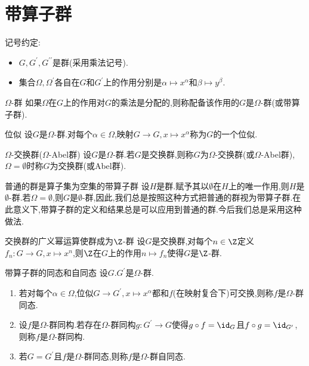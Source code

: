 \section{带算子群}

记号约定:
\begin{itemize}
	\item $G,G^{\prime},G^{\prime\prime}$是群(采用乘法记号).
	\item 集合$\Omega,\Omega^{\prime}$各自在$G$和$G^{\prime}$上的作用分别是$\alpha\mapsto x^{\alpha}$和$\beta\mapsto y^{\beta}$.
\end{itemize}

\begin{definition}{$\Omega$-群}{}
	如果$\Omega$在$G$上的作用对$G$的乘法是分配的,则称配备该作用的$G$是$\Omega$-群(或带算子群).
\end{definition}

\begin{definition}{位似}{}
	设$G$是$\Omega$-群.对每个$\alpha\in\Omega$,映射$G\to G,x\mapsto x^{\alpha}$称为$G$的一个位似.
\end{definition}

\begin{definition}{$\Omega$-交换群($\Omega$-Abel群)}{}
	设$G$是$\Omega$-群.若$G$是交换群,则称$G$为$\Omega$-交换群(或$\Omega$-Abel群),$\Omega=\emptyset$时称$G$为交换群(或Abel群).
\end{definition}

\begin{remark}{普通的群是算子集为空集的带算子群}{}
	设$H$是群.赋予其以$\emptyset$在$H$上的唯一作用,则$H$是$\emptyset$-群.若$\Omega=\emptyset$,则$G$是$\emptyset$-群,因此,我们总是按照这种方式把普通的群视为带算子群.在此意义下,带算子群的定义和结果总是可以应用到普通的群.今后我们总是采用这种做法.
\end{remark}

\begin{example}{交换群的广义幂运算使群成为$\Z$-群}{}
	设$G$是交换群,对每个$n\in\Z$定义$f_{n}:G\to G,x\mapsto x^{n}$,则$\Z$在$G$上的作用$n\mapsto f_{n}$使得$G$是$\Z$-群.
\end{example}

\begin{definition}{带算子群的同态和自同态}{}
	设$G.G^{\prime}$是$\Omega$-群.
	\begin{enumerate}
		\item 若对每个$\alpha\in\Omega$,位似$G\to G^{\prime},x\mapsto x^{\alpha}$都和$f$(在映射复合下)可交换,则称$f$是$\Omega$-群同态.
		\item 设$f$是$\Omega$-群同构.若存在$\Omega$-群同构$g:G^{\prime}\to G$使得$g\circ f=\id_{G}$且$f\circ g=\id_{G^{\prime}}$,则称$f$是$\Omega$-群同构.
		\item 若$G=G^{\prime}$且$f$是$\Omega$-群同态,则称$f$是$\Omega$-群自同态.
	\end{enumerate}
\end{definition}

